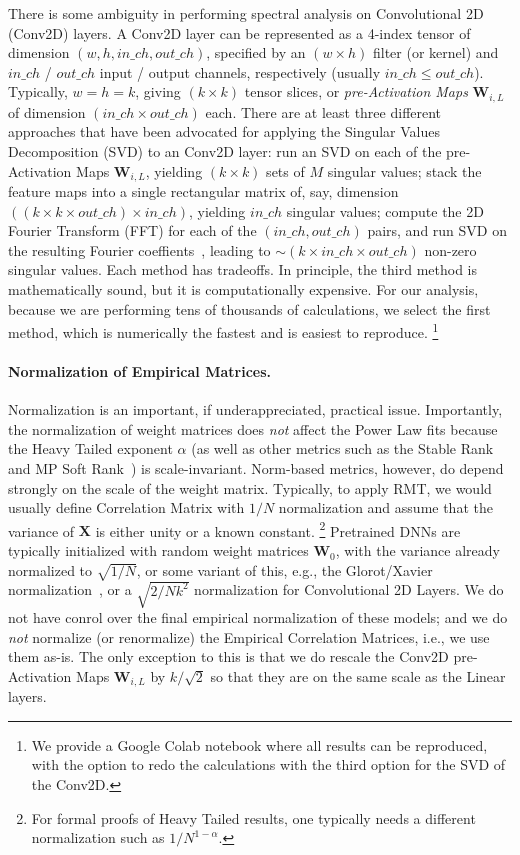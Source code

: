 There is some ambiguity in performing spectral analysis on Convolutional 2D (Conv2D) layers.  
A Conv2D layer can be represented as a 4-index tensor of dimension $(w,h,in\_ch,out\_ch)$, specified by an $(w\times h)$ filter (or kernel) and $in\_ch$ / $out\_ch$ input / output channels, respectively (usually $in\_ch\le out\_ch$). 
Typically, $w=h=k$,  giving $(k\times k)$ tensor slices, or \emph{pre-Activation Maps} $\mathbf{W}_{i,L}$ of dimension $(in\_ch\times out\_ch)$ each. 
%
There are at least three different approaches that have been advocated for applying the Singular Values Decomposition (SVD) to an Conv2D layer:
run an SVD on each of the pre-Activation Maps $\mathbf{W}_{i,L}$, yielding $(k\times k)$ sets of $M$ singular values; 
stack the feature maps into a single rectangular matrix of, say, dimension $((k\times k\times out\_ch)\times in\_ch)$, yielding $in\_ch$ singular values;
compute the 2D Fourier Transform (FFT) for each of the $(in\_ch, out\_ch)$ pairs, and run SVD on the resulting Fourier coeffients~\cite{Long2019}, leading to $\sim(k\times in\_ch\times out\_ch)$ non-zero singular values.
Each method has tradeoffs.  
In principle, the third method is mathematically sound, but it is computationally expensive. 
For our analysis, because we are performing tens of thousands of calculations, we select the first method, which is numerically the fastest and is easiest to reproduce.%
\footnote{We provide a Google Colab notebook where all results can be reproduced, with the option to redo the calculations with the third option for the SVD of the Conv2D.}


\paragraph{Normalization of Empirical Matrices.}  
Normalization is an important, if underappreciated, practical issue.
Importantly, the normalization of weight matrices does \emph{not} affect the Power Law fits because the Heavy Tailed exponent $\alpha$ (as well as other metrics such as the Stable Rank and MP Soft Rank~\cite{MM18_TR,MM19_HTSR_ICML}) is scale-invariant.
Norm-based metrics, however, do depend strongly on the scale of the weight matrix.
Typically, to apply RMT, we would usually define Correlation Matrix with $1/N$ normalization and assume that the variance of $\mathbf{X}$ is either unity or a known constant.%
\footnote{For formal proofs of Heavy Tailed results, one typically needs a different normalization such as $1/N^{1-\alpha}$.}
Pretrained DNNs are typically initialized with random weight matrices $\mathbf{W}_{0}$, with the variance already normalized to $\sqrt{1/N}$, or some variant of this, e.g., the Glorot/Xavier normalization~\cite{GloRot}, or a $\sqrt{2/Nk^2}$ normalization for Convolutional 2D Layers.
We do not have conrol over the final empirical normalization of these models; and we do \emph{not} normalize (or renormalize) the Empirical Correlation Matrices, i.e., we use them as-is.
The only exception to this is that we do rescale the Conv2D pre-Activation Maps $\mathbf{W}_{i,L}$ by $k/\sqrt{2}$ so that they are on the same scale as the Linear layers.

